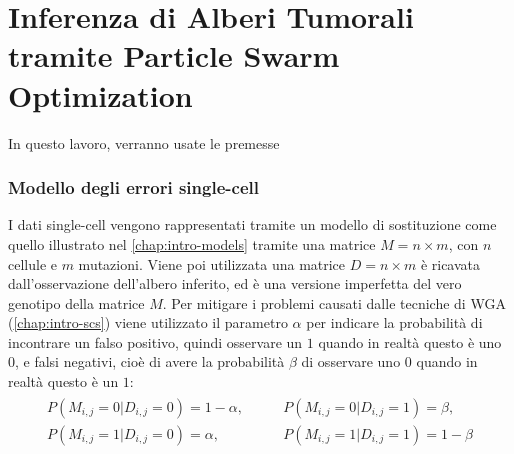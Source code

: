 \chapter{Inferenza di Alberi Tumorali tramite Particle Swarm Optimization}
\label{chap:pso}
In questo lavoro, verranno usate le premesse 

\subsection{Modello degli errori single-cell}
\label{chap:art-intro-model-matrix}
I dati single-cell vengono rappresentati tramite un modello di sostituzione come quello illustrato nel \autoref{chap:intro-models} tramite una matrice $M = n \times m$, con $n$ cellule e $m$ mutazioni. Viene poi utilizzata una matrice $D = n \times m$ è ricavata dall'osservazione dell'albero inferito, ed è una versione imperfetta del vero genotipo della matrice $M$. Per mitigare i problemi causati dalle tecniche di WGA (\autoref{chap:intro-scs}) viene utilizzato il parametro $\alpha$ per indicare la probabilità di incontrare un falso positivo, quindi osservare un $1$ quando in realtà questo è uno $0$, e falsi negativi, cioè di avere la probabilità $\beta$ di osservare uno $0$ quando in realtà questo è un $1$:
\begin{align}
    \label{eq:art-intro-model-matrix}
    \begin{split}
      P(M_{i,j} = 0 | D_{i,j} = 0) = 1 - \alpha, \qquad
      &P(M_{i,j} = 0 | D_{i,j} = 1) = \beta, \\
      P(M_{i,j} = 1 | D_{i,j} = 0) = \alpha, \qquad
      &P(M_{i,j} = 1 | D_{i,j} = 1) = 1 - \beta
    \end{split}
\end{align}

\subsection{}
